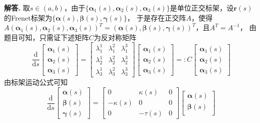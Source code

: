 \documentclass[12pt, a4paper, oneside]{ctexart}
\newenvironment{solution}[1][]{\par\noindent\textbf{#1解答. }}{\smallskip\par}  %
\def\bd{\boldsymbol}        %
\def\d{\mathrm{d}}          %
\begin{document}
\begin{solution}
    取$s\in(a,b)$，由于$\{\bd{\alpha}_1(s),\bd{\alpha}_2(s),\bd{\alpha}_3(s)\}$是单位正交标架，设$\bd{r}(s)$的Frenet标架为$\{\bd{\alpha}(s),\bd{\beta}(s),\bd{\gamma}(s)\}$，
    于是存在正交阵$A$，使得$A(\bd{\alpha}_1(s),\bd{\alpha}_2(s),\bd{\alpha}_3(s))^T = (\bd{\alpha}(s),\bd{\beta}(s),\bd{\gamma}(s))^T$，且$A^T = A^{-1}$，
    由题目可知，只需证下述矩阵$C$为反对称矩阵
    \begin{equation}
        \frac{\d}{\d s}\begin{bmatrix}
            \bd{\alpha}_1(s)\\
            \bd{\alpha}_2(s)\\
            \bd{\alpha}_3(s)
        \end{bmatrix} = \begin{bmatrix}
            \lambda_1^1&\lambda_1^2&\lambda_1^3\\
            \lambda_2^1&\lambda_2^2&\lambda_2^3\\
            \lambda_3^1&\lambda_3^2&\lambda_3^3
        \end{bmatrix}\begin{bmatrix}
            \bd{\alpha}_1(s)\\
            \bd{\alpha}_2(s)\\
            \bd{\alpha}_3(s)
        \end{bmatrix}=: C\begin{bmatrix}
            \bd{\alpha}_1(s)\\
            \bd{\alpha}_2(s)\\
            \bd{\alpha}_3(s)
        \end{bmatrix}
    \end{equation}
    由标架运动公式可知
    \begin{equation*}
        \frac{\d}{\d s}\begin{bmatrix}
            \bd{\alpha}(s)\\
            \bd{\beta}(s)\\
            \bd{\gamma}(s)
        \end{bmatrix} = \begin{bmatrix}
            0&\kappa(s)&0\\
            -\kappa(s)&0&0\\
            0&-\tau(s)&0
        \end{bmatrix}\begin{bmatrix}
            \bd{\alpha}(s)\\
            \bd{\beta}(s)\\

\end{bmatrix}
\end{equation*}
\end{solution}
\end{document}
